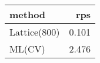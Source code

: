 \begin{tabular}{lr}
\toprule
method & rps \\
\midrule
Lattice(800) & 0.101 \\
ML(CV) & 2.476 \\
\bottomrule
\end{tabular}
